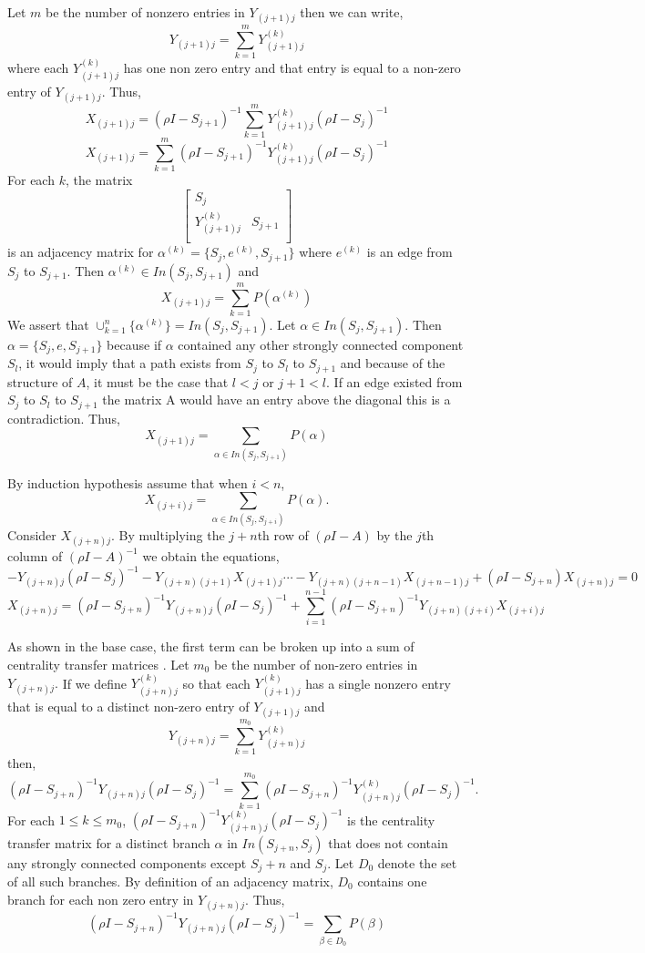 \documentclass{paper}
\begin{document}
Let $m$ be the number of nonzero entries in $Y_{(j+1)j}$ then we can write, 
\[Y_{(j+1)j} = \sum_{k=1}^{m} Y_{(j+1)j}^{(k)}\] 
where each $Y_{(j+1)j}^{(k)}$ has one non zero entry and that entry is equal to a non-zero entry of $Y_{(j+1)j}$. Thus, 
\[
X_{(j+1)j} = (\rho I - S_{j+1})^{-1} \sum_{k=1}^{m} Y_{(j+1)j}^{(k)}(\rho I - S_j)^{-1}
\]
\[
X_{(j+1)j} = \sum_{k=1}^{m}(\rho I - S_{j+1})^{-1}  Y_{(j+1)j}^{(k)}(\rho I - S_j)^{-1}
\]
For each $k$, the matrix
\[
\begin{bmatrix}
S_j \\
Y_{(j+1)j}^{(k)} & S_{j+1}\\
\end{bmatrix}
\]
is an adjacency matrix for $\alpha^{(k)}=\{S_{j},e^{(k)},S_{j+1}\}$
where $e^{(k)}$ is an edge from $S_j$ to $S_{j+1}$. Then $\alpha^{(k)} \in In(S_j,S_{j+1})$ and 
\[
X_{(j+1)j} = \sum_{k=1}^{m}P(\alpha^{(k)})
\] 
We assert that $\cup_{k=1}^n\{\alpha^{(k)}\} = In(S_j,S_{j+1})$. Let $\alpha \in In(S_j,S_{j+1})$. Then $\alpha = \{S_j,e,S_{j+1} \}$ because if $\alpha$ contained any other strongly connected component $S_l$, it would imply that a path exists from $S_j$ to $S_l$ to $S_{j+1}$ and because of the structure of $A$, it must be the case that $l < j$ or $j+1 < l$. If an edge existed from $S_j$ to $S_{l}$ to $S_{j+1}$ the matrix A would have an entry above the diagonal this is a contradiction. Thus, 
\[
X_{(j+1)j} = \sum_{\alpha \in In(S_j,S_{j+1})}P(\alpha)
\]

By induction hypothesis assume that when $i < n$, \[
X_{(j+i)j} = \sum_{\alpha \in In(S_j,S_{j+i})}P(\alpha).
\]
Consider $X_{(j+n)j}$. By multiplying the $j+n$th row of $(\rho I - A)$ by the $j$th column of $(\rho I - A)^{-1}$ we obtain the equations,
\[
-Y_{(j+n)j}(\rho I - S_j)^{-1} -Y_{(j+n)(j+1)}X_{(j+1)j} \cdots -Y_{(j+n)(j+n-1)}X_{(j+n-1)j} + (\rho I - S_{j+n})X_{(j+n)j} = 0
\]
\begin{equation}
X_{(j+n)j} = (\rho I - S_{j+n})^{-1} Y_{(j+n)j}(\rho I - S_j)^{-1} + \sum_{i=1}^{n-1}(\rho I - S_{j+n})^{-1}Y_{(j+n)(j+i)}X_{(j+i)j} 
\end{equation}



As shown in the base case, the first term can be broken up into a sum of centrality transfer matrices . Let $m_0$ be the number of non-zero entries in $Y_{(j+n)j}.$ If we define $Y_{(j+n)j}^{(k)}$ so that each $Y_{(j+1)j}^{(k)}$ has a single nonzero entry that is equal to a distinct non-zero entry of $Y_{(j+1)j}$ and
\[Y_{(j+n)j} = \sum_{k=1}^{m_0} Y_{(j+n)j}^{(k)}\]
then,
\[
(\rho I - S_{j+n})^{-1} Y_{(j+n)j}(\rho I - S_j)^{-1} = \sum_{k=1}^{m_0}(\rho I - S_{j+n})^{-1} Y_{(j+n)j}^{(k)}(\rho I - S_j)^{-1}.
\]
For each $1 \leq k \leq m_0 $, $(\rho I - S_{j+n})^{-1} Y_{(j+n)j}^{(k)}(\rho I - S_j)^{-1}$ is the centrality transfer matrix for a distinct branch $\alpha$ in $In(S_{j+n},S_j)$ that does not contain any strongly connected components except $S_j+n$ and $S_j$. Let $D_0$ denote the set of all such branches. By definition of an adjacency matrix,  $D_0$ contains one branch for each non zero entry in $Y_{(j+n)j}$. Thus,
\begin{equation}
(\rho I - S_{j+n})^{-1} Y_{(j+n)j}(\rho I - S_j)^{-1} = \sum_{\beta \in D_0}P(\beta)
\end{equation}
\end{document}
